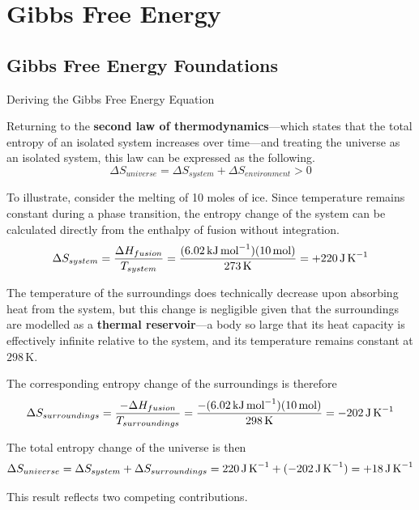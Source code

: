 \documentclass[10pt]{article}
\begin{document}
\section{Gibbs Free Energy}

  \subsection{Gibbs Free Energy Foundations}

    \begin{core}{Deriving the Gibbs Free Energy Equation}

      Returning to the \textbf{second law of thermodynamics}---which states that the total entropy of an isolated system increases over time---and treating the universe as an isolated system, this law can be expressed as the following.
      \[
        \Delta S_{universe} = \Delta S_{system} + \Delta S_{environment} > 0
      \]

      To illustrate, consider the melting of 10 moles of ice. Since temperature remains constant during a phase transition, the entropy change of the system can be calculated directly from the enthalpy of fusion without integration.
      \[
        \Delta S_{system} = \frac{\Delta H_{fusion}}{T_{system}} = \frac{(6.02\,\text{kJ\,mol}^{-1})(10\,\text{mol})}{273\,\text{K}} = +220\,\text{J\,K}^{-1}
      \]

      The temperature of the surroundings does technically decrease upon absorbing heat from the system, but this change is negligible given that the surroundings are modelled as a \textbf{thermal reservoir}---a body so large that its heat capacity is effectively infinite relative to the system, and its temperature remains constant at $298\,\text{K}$.

      The corresponding entropy change of the surroundings is therefore
      \[
        \Delta S_{surroundings} = \frac{-\Delta H_{fusion}}{T_{surroundings}} = \frac{-(6.02\,\text{kJ\,mol}^{-1})(10\,\text{mol})}{298\,\text{K}} = -202\,\text{J\,K}^{-1}
      \]

      The total entropy change of the universe is then
      \[
        \Delta S_{universe} = \Delta S_{system} + \Delta S_{surroundings} = 220\,\text{J\,K}^{-1} + (-202\,\text{J\,K}^{-1}) = +18\,\text{J\,K}^{-1}
      \]

      This result reflects two competing contributions.

      \begin{enumerate}[label=(\arabic*)]


\end{enumerate}
\end{core}
\end{document}
